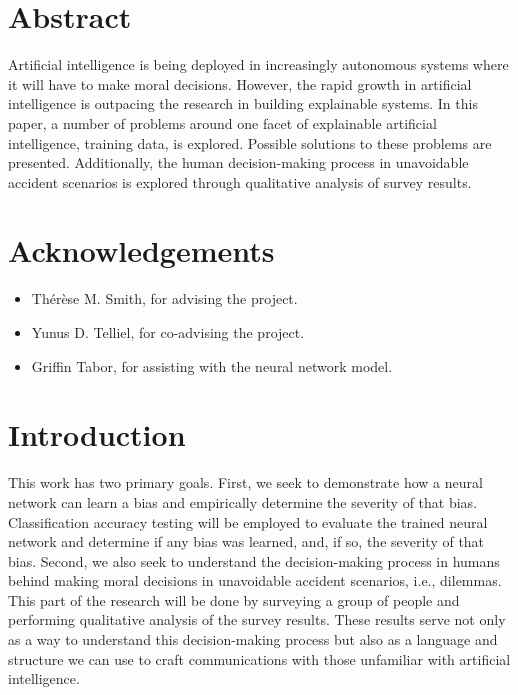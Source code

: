 \documentclass[paper=a4paper]{report}
\begin{document}

\chapter*{Abstract}

Artificial intelligence is being deployed in increasingly autonomous systems where it will have to
make moral decisions. However, the rapid growth in artificial intelligence is outpacing the research
in building explainable systems. In this paper, a number of problems around one facet of explainable
artificial intelligence, training data, is explored. Possible solutions to these problems are
presented. Additionally, the human decision-making process in unavoidable accident scenarios is
explored through qualitative analysis of survey results.

\chapter*{Acknowledgements}

\begin{itemize}
    \item Th\'{e}r\`{e}se M. Smith, for advising the project.
    \item Yunus D. Telliel, for co-advising the project.
    \item Griffin Tabor, for assisting with the neural network model.
\end{itemize}

\tableofcontents

\FloatBarrier
\chapter{Introduction}

This work has two primary goals. First, we seek to demonstrate how a neural network can learn a bias
and empirically determine the severity of that bias. Classification accuracy testing will be
employed to evaluate the trained neural network and determine if any bias was learned, and, if so,
the severity of that bias. Second, we also seek to understand the decision-making process in humans
behind making moral decisions in unavoidable accident scenarios, i.e., dilemmas. This part of the
research will be done by surveying a group of people and performing qualitative analysis of the
survey results. These results serve not only as a way to understand this decision-making process but
also as a language and structure we can use to craft communications with those unfamiliar with
artificial intelligence.
\end{document}
